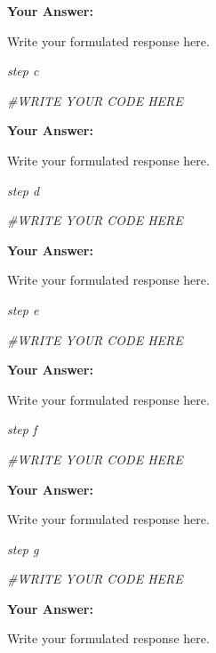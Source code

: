 \documentclass[
]{article}
\newenvironment{Shaded}{\begin{snugshade}}{\end{snugshade}}
\newcommand{\CommentTok}[1]{\textcolor[rgb]{0.56,0.35,0.01}{\textit{#1}}}
\begin{document}
\textbf{Your Answer:}

Write your formulated response here.

\emph{step c}

\begin{Shaded}
\begin{Highlighting}[]
\CommentTok{\#WRITE YOUR CODE HERE}
\end{Highlighting}
\end{Shaded}

\textbf{Your Answer:}

Write your formulated response here.

\emph{step d}

\begin{Shaded}
\begin{Highlighting}[]
\CommentTok{\#WRITE YOUR CODE HERE}
\end{Highlighting}
\end{Shaded}

\textbf{Your Answer:}

Write your formulated response here.

\emph{step e}

\begin{Shaded}
\begin{Highlighting}[]
\CommentTok{\#WRITE YOUR CODE HERE}
\end{Highlighting}
\end{Shaded}

\textbf{Your Answer:}

Write your formulated response here.

\emph{step f}

\begin{Shaded}
\begin{Highlighting}[]
\CommentTok{\#WRITE YOUR CODE HERE}
\end{Highlighting}
\end{Shaded}

\textbf{Your Answer:}

Write your formulated response here.

\emph{step g}

\begin{Shaded}
\begin{Highlighting}[]
\CommentTok{\#WRITE YOUR CODE HERE}
\end{Highlighting}
\end{Shaded}

\textbf{Your Answer:}

Write your formulated response here.
\end{document}
